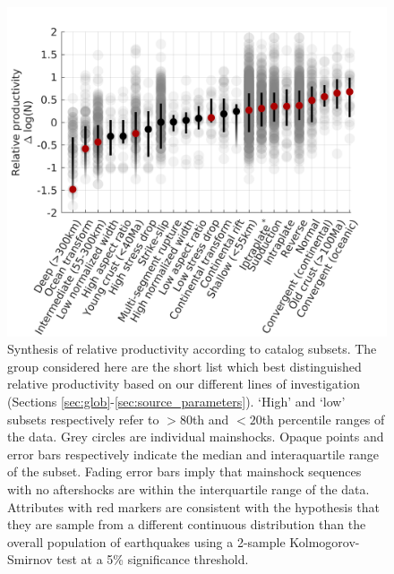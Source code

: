 \documentclass[draft, jgrga]{agujournal2018}
\begin{document}
 \begin{figure}
        \centering
        \includegraphics{figures/cal_tech.png}
        \caption{Synthesis of relative productivity according to catalog subsets. The group considered here are the short list which best distinguished relative productivity based on our different lines of investigation (Sections \ref{sec:glob}-\ref{sec:source_parameters}). `High' and `low' subsets respectively refer to $>80$th and $<20$th percentile ranges of the data. Grey circles are individual mainshocks. Opaque points and error bars respectively indicate the median and interaquartile range of the subset. Fading error bars imply that mainshock sequences with no aftershocks are within the interquartile range of the data. Attributes with red markers are consistent with the hypothesis that they are sample from a different continuous distribution than the overall population of earthquakes using a 2-sample Kolmogorov-Smirnov test at a 5\% significance threshold.}
        \label{fig:caltech}
    \end{figure}   
    
\end{document}
